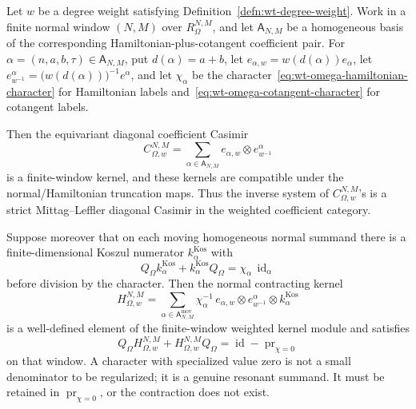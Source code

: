 \begin{thm}\label{thm:wt-omega-kernel-admissibility}
  Let \(w\) be a degree weight satisfying
  Definition~\ref{defn:wt-degree-weight}.  Work in a finite normal window
  \((N,M)\) over \(R_{\Omega}^{N,M}\), and let
  \(\mathsf A_{N,M}\) be a homogeneous basis of the corresponding
  Hamiltonian-plus-cotangent coefficient pair.  For
  \(\alpha=(n,a,b,\tau)\in\mathsf A_{N,M}\), put
  \(d(\alpha)=a+b\), let \(e_{\alpha,w}=w(d(\alpha))e_\alpha\), let
  \(e^\alpha_{w^{-1}}=\bigl(w(d(\alpha))\bigr)^{-1}e^\alpha\), and let
  \(\chi_\alpha\) be the character~\eqref{eq:wt-omega-hamiltonian-character}
  for Hamiltonian labels and~\eqref{eq:wt-omega-cotangent-character} for
  cotangent labels.

  Then the equivariant diagonal coefficient Casimir
  \begin{equation}\label{eq:wt-omega-casimir}
    C_{\Omega,w}^{N,M}
      =
    \sum_{\alpha\in\mathsf A_{N,M}}
      e_{\alpha,w}\otimes e^\alpha_{w^{-1}}
  \end{equation}
  is a finite-window kernel, and these kernels are compatible under the
  normal/Hamiltonian truncation maps.  Thus the inverse system of
  \(C_{\Omega,w}^{N,M}\)'s is a strict Mittag--Leffler diagonal Casimir in
  the weighted coefficient category.

  Suppose moreover that on each moving homogeneous normal summand there is
  a finite-dimensional Koszul numerator \(k^{\mathrm{Kos}}_\alpha\) with
  \[
    Q_\Omega k^{\mathrm{Kos}}_\alpha
      +k^{\mathrm{Kos}}_\alpha Q_\Omega
      =
    \chi_\alpha\,\operatorname{id}_\alpha
  \]
  before division by the character.  Then the normal contracting kernel
  \begin{equation}\label{eq:wt-omega-normal-kernel}
    H_{\Omega,w}^{N,M}
      =
    \sum_{\alpha\in\mathsf A^{\mathrm{mov}}_{N,M}}
      \chi_\alpha^{-1}\,
      e_{\alpha,w}\otimes e^\alpha_{w^{-1}}\otimes
      k^{\mathrm{Kos}}_\alpha
  \end{equation}
  is a well-defined element of the finite-window weighted kernel module and
  satisfies
  \[
    Q_\Omega H_{\Omega,w}^{N,M}
      +H_{\Omega,w}^{N,M}Q_\Omega
      =
    \operatorname{id}-\operatorname{pr}_{\chi=0}
  \]
  on that window.  A character with specialized value zero is not a small
  denominator to be regularized; it is a genuine resonant summand.  It must
  be retained in \(\operatorname{pr}_{\chi=0}\), or the contraction does not
  exist.


\end{thm}
